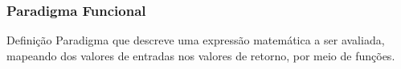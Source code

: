 \begin{frame}
    \frametitle{Paradigma Funcional}

    \begin{block}{Definição}
      Paradigma que descreve uma expressão matemática a ser avaliada,
      mapeando dos valores de entradas nos valores de retorno, por meio de funções.
    \end{block} \pause 
     
\end{frame}